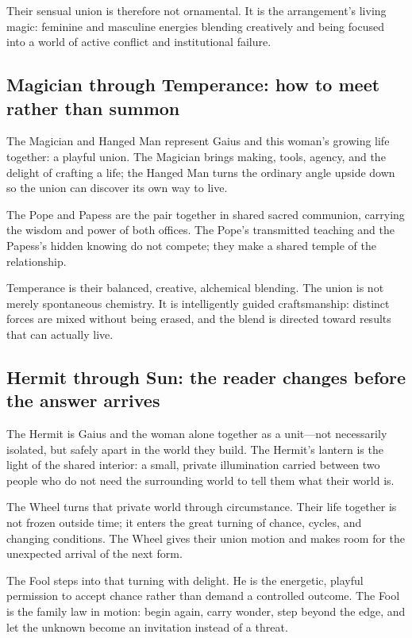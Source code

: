 Their sensual union is therefore not ornamental. It is the arrangement's living
magic: feminine and masculine energies blending creatively and being focused
into a world of active conflict and institutional failure.

\subsection{Magician through Temperance: how to meet rather than summon}

The Magician and Hanged Man represent Gaius and this woman's growing life
together: a playful union. The Magician brings making, tools, agency, and the
delight of crafting a life; the Hanged Man turns the ordinary angle upside down
so the union can discover its own way to live.

The Pope and Papess are the pair together in shared sacred communion, carrying
the wisdom and power of both offices. The Pope's transmitted teaching and the
Papess's hidden knowing do not compete; they make a shared temple of the
relationship.

Temperance is their balanced, creative, alchemical blending. The union is not
merely spontaneous chemistry. It is intelligently guided craftsmanship: distinct
forces are mixed without being erased, and the blend is directed toward results
that can actually live.

\subsection{Hermit through Sun: the reader changes before the answer arrives}

The Hermit is Gaius and the woman alone together as a unit—not necessarily
isolated, but safely apart in the world they build. The Hermit's lantern is the
light of the shared interior: a small, private illumination carried between two
people who do not need the surrounding world to tell them what their world is.

The Wheel turns that private world through circumstance. Their life together is
not frozen outside time; it enters the great turning of chance, cycles, and
changing conditions. The Wheel gives their union motion and makes room for the
unexpected arrival of the next form.

The Fool steps into that turning with delight. He is the energetic, playful
permission to accept chance rather than demand a controlled outcome. The Fool
is the family law in motion: begin again, carry wonder, step beyond the edge,
and let the unknown become an invitation instead of a threat.

